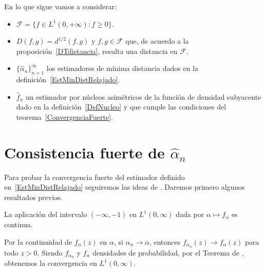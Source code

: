 \vspace{1cm}

En lo que sigue vamos a considerar:
\begin{itemize}
	\item $\mathcal{F}=\{f \in L^1(0,+\infty) : f \geq 0\}$.
	\item $D(f,g)=d^{1/2}(f,g)$ y $f,g \in \mathcal{F} $ que, de acuerdo a la proposición~\ref{DTdistancia}, resulta una distancia en $\mathcal{F}$.
	\item $\{\widehat{\alpha}_n\}_{n=1}^{\infty}$ los estimadores de mínima distancia dados en la definición~\eqref{EstMinDistRelajado}.
	\item $\widehat{f}_n$ un estimador por núcleos asimétricos de la función de densidad subyacente dado en la definición~\ref{DefNucleo} y que cumple las condiciones del teorema~\ref{ConvergenciaFuerte}.
\end{itemize}

\section{Consistencia fuerte de $\widehat{\alpha}_{n}$}

\vspace{0.5cm}

Para probar la convergencia fuerte del estimador definido en~\eqref{EstMinDistRelajado} seguiremos las ideas de \citet{parr1982}. Daremos primero algunos resultados previos.

\begin{proposition}
	\label{continuidad}
	La aplicación del intervalo $(-\infty,-1)$ en $L^{1}(0,\infty)$ dada por
	$\alpha \mapsto f_{\alpha}$ es continua.
\end{proposition}
\begin{dem}
	Por la continuidad de $f_{\alpha}(z)$ en $\alpha$, si $\alpha_{n} \to \alpha$, 
	entonces $f_{\alpha_{n}}(z) \to f_{\alpha}(z)$ para todo $z>0$.
	Siendo $f_{\alpha_{n}}$ y $f_{\alpha}$ densidades de probabilidad, por el Teorema de \citet{scheffe1947}, obtenemos
	la convergencia en $L^{1}(0,\infty)$.
\end{dem}

